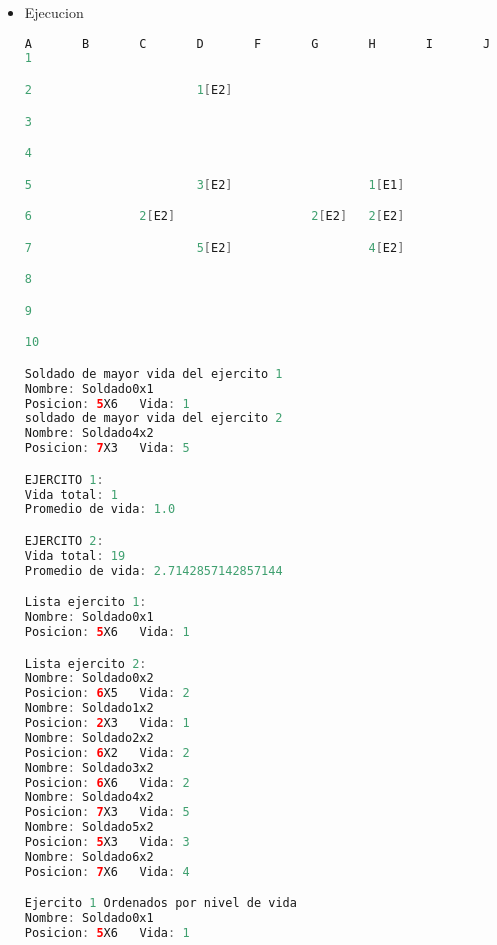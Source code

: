 \documentclass{article}
\begin{document}
\begin{itemize}
\begin{itemize}
\begin{lstlisting}[language=java]
	public void setColumna(int columna) {
		this.columna = columna;
	}

	public void setPuntos(int puntos) {
		this.puntos = puntos;
	}
	
	public void setColumn(String column) {
		this.column = column;
	}

	// METODOS ACCESORES
	public String getNombre() {
		return nombre;
	}

	public int getFila() {
		return fila;
	}

	public int getColumna() {
		return columna;
	}

	public int getPuntos() {
		return puntos;
	}
	
	public String getColumn() {
		return column;
	}
}
         \end{lstlisting}

         \item Ejecucion
         \begin{lstlisting}[language=java]
        A       B       C       D       F       G       H       I       J
1

2                       1[E2]

3

4

5                       3[E2]                   1[E1]

6               2[E2]                   2[E2]   2[E2]

7                       5[E2]                   4[E2]

8

9

10

Soldado de mayor vida del ejercito 1
Nombre: Soldado0x1
Posicion: 5X6   Vida: 1
soldado de mayor vida del ejercito 2
Nombre: Soldado4x2
Posicion: 7X3   Vida: 5

EJERCITO 1:
Vida total: 1
Promedio de vida: 1.0

EJERCITO 2:
Vida total: 19
Promedio de vida: 2.7142857142857144

Lista ejercito 1:
Nombre: Soldado0x1
Posicion: 5X6   Vida: 1

Lista ejercito 2:
Nombre: Soldado0x2
Posicion: 6X5   Vida: 2
Nombre: Soldado1x2
Posicion: 2X3   Vida: 1
Nombre: Soldado2x2
Posicion: 6X2   Vida: 2
Nombre: Soldado3x2
Posicion: 6X6   Vida: 2
Nombre: Soldado4x2
Posicion: 7X3   Vida: 5
Nombre: Soldado5x2
Posicion: 5X3   Vida: 3
Nombre: Soldado6x2
Posicion: 7X6   Vida: 4

Ejercito 1 Ordenados por nivel de vida
Nombre: Soldado0x1
Posicion: 5X6   Vida: 1


\end{lstlisting}
\end{itemize}
\end{itemize}
\end{document}
